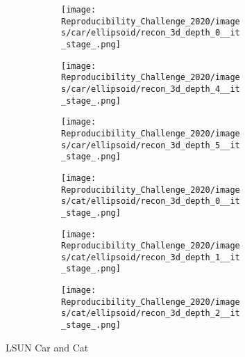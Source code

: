 \begin{figure}[h]
\begin{subfigure}{0.80\textwidth}
    \begin{subfigure}{0.16\textwidth}
        \centering
        \texttt{[image: Reproducibility\_Challenge\_2020/images/car/ellipsoid/recon\_3d\_depth\_0\_\_it\_stage\_.png]}
        \caption{}
    \end{subfigure}
    \begin{subfigure}{0.16\textwidth}
        \centering
        \texttt{[image: Reproducibility\_Challenge\_2020/images/car/ellipsoid/recon\_3d\_depth\_4\_\_it\_stage\_.png]}
        \caption{}
    \end{subfigure}
    \begin{subfigure}{0.16\textwidth}
        \centering
        \texttt{[image: Reproducibility\_Challenge\_2020/images/car/ellipsoid/recon\_3d\_depth\_5\_\_it\_stage\_.png]}
        \caption{}
    \end{subfigure}
    \begin{subfigure}{0.16\textwidth}
        \centering
        \texttt{[image: Reproducibility\_Challenge\_2020/images/cat/ellipsoid/recon\_3d\_depth\_0\_\_it\_stage\_.png]}
        \caption{}
    \end{subfigure}
    \begin{subfigure}{0.16\textwidth}
        \centering
        \texttt{[image: Reproducibility\_Challenge\_2020/images/cat/ellipsoid/recon\_3d\_depth\_1\_\_it\_stage\_.png]}
        \caption{}
    \end{subfigure}
    \begin{subfigure}{0.16\textwidth}
        \centering
        \texttt{[image: Reproducibility\_Challenge\_2020/images/cat/ellipsoid/recon\_3d\_depth\_2\_\_it\_stage\_.png]}
        \caption{}
    \end{subfigure}
    
    \end{subfigure}
    \caption{LSUN Car and Cat}
    \label{fig:result-car-cat}
\end{figure}

